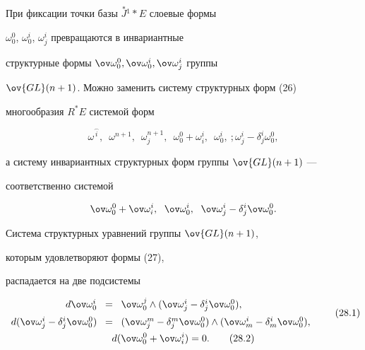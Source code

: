 При фиксации точки базы $\overset{*}{J}{}^1* E$ слоевые формы


$\omega_0^0$, $\omega_0^i$, $\omega_j^i$ превращаются в инвариантные 


структурные формы $\ov \omega_0^0,\ov \omega_0^i,\ov \omega_j^i$ группы


$\ov {GL} ({n+1})$. Можно заменить систему структурных форм (26) 


многообразия $R^ * E$ системой форм


$$


\omega^{\overset{\frown}{i}{}},\ \;


\omega^{n+1},\ \; \omega_j^{n+1},\ \; \omega_0^0+\omega_i^i,


\ \; \omega_0^i,\ ; \omega_j^i-\delta_j^i \omega_0^0,


$$


а систему инвариантных структурных форм группы $\ov {GL} ({n+1})$ --- 


соответственно системой


\begin{equation}


\ov \omega_0^0+\ov \omega_i^i,\ \; \ov \omega_0^i,


\ \; \ov \omega_j^i-\delta_j^i \ov \omega_0^0.


\end{equation}


Система структурных уравнений группы $\ov {GL} ({n+1})$, 


которым удовлетворяют формы (27),


распадается на две подсистемы


\begin{gather}


\begin{array}{rcl}


d\ov \omega_0^i\! &=&\! \ov \omega_0^j \wedge


({\ov \omega_j^i-\delta_j^i \ov \omega_0^0}), \\[2mm]


d ({\ov \omega_j^i-\delta_j^i \ov \omega_0^0})\! &=&\! ({\ov


\omega_j^m-\delta_j^m \ov \omega_0^0}) \wedge ({\ov


\omega_m^i-\delta_m^i \ov \omega_0^0}),


\end{array}\tag{28.1} \\


%


d ({\ov \omega_0^0+\ov \omega_i^i})=0.\tag{28.2}


\end{gather}


